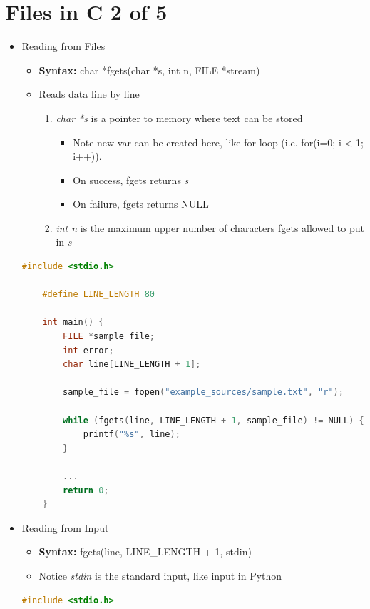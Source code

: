 \documentclass[12pt]{article}
\begin{document}
\bigskip

\section*{Files in C 2 of 5}

\bigskip

\begin{itemize}
    \item Reading from Files
    \begin{itemize}
        \item \textbf{Syntax:} char *fgets(char *s, int n, FILE *stream)
        \item Reads data line by line
        \begin{enumerate}[1.]
            \item \textit{char *s} is a pointer to memory where text can be stored
            \begin{itemize}
                \item Note new var can be created here, like for loop (i.e. for(i=0; i < 1; i++)).
                \item On success, fgets returns \textit{s}
                \item On failure, fgets returns NULL
            \end{itemize}
            \item \textit{int n} is the maximum upper number of characters fgets allowed to put in \textit{s}
        \end{enumerate}
    \end{itemize}

    \begin{lstlisting}[language=c]
    #include <stdio.h>

    #define LINE_LENGTH 80

    int main() {
        FILE *sample_file;
        int error;
        char line[LINE_LENGTH + 1];

        sample_file = fopen("example_sources/sample.txt", "r");

        while (fgets(line, LINE_LENGTH + 1, sample_file) != NULL) {
            printf("%s", line);
        }

        ...
        return 0;
    }
    \end{lstlisting}

    \item Reading from Input
    \begin{itemize}
        \item \textbf{Syntax:} fgets(line, LINE\_LENGTH + 1, stdin)
        \item Notice \textit{stdin} is the standard input, like input in Python
    \end{itemize}
    \begin{lstlisting}[language=c]
    #include <stdio.h>


\end{lstlisting}
\end{itemize}
\end{document}
